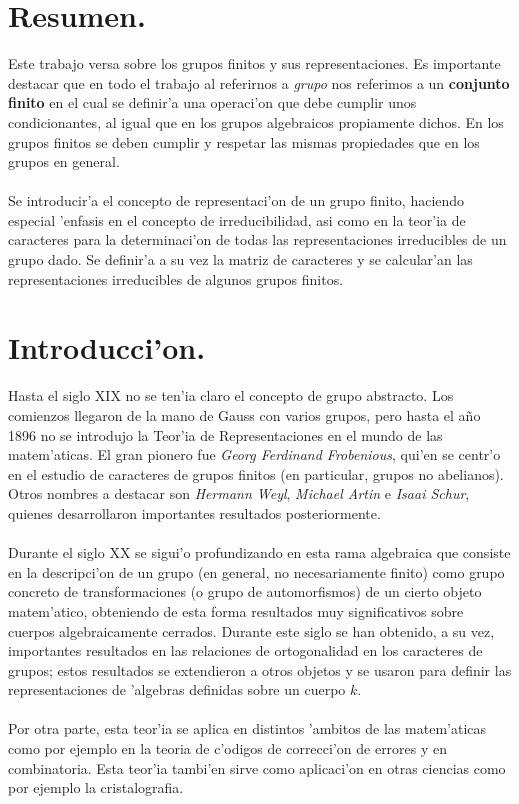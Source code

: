 \documentclass[a4paper,openright,12pt]{book}
\numberwithin{equation}{section} %
\begin{document}
\chapter*{Resumen.}
Este trabajo versa sobre los grupos finitos y sus representaciones. Es importante destacar que en todo el trabajo al referirnos a \textit{grupo} nos referimos a un  \textbf{conjunto finito} en el cual se definir'a una operaci'on que debe cumplir unos condicionantes, al igual que en los grupos algebraicos propiamente dichos. En los grupos finitos se deben cumplir y respetar las mismas propiedades que en los grupos en general.\\
\\
Se introducir'a el concepto de representaci'on de un grupo finito, haciendo especial 'enfasis en el concepto de irreducibilidad, asi como en la teor'ia de caracteres para la determinaci'on de todas las representaciones irreducibles de un grupo dado. Se definir'a a su vez la matriz de caracteres y se calcular'an las representaciones irreducibles de algunos grupos finitos. 

\tableofcontents
\chapter*{Introducci'on.}
Hasta el siglo XIX no se ten'ia claro el concepto de grupo abstracto. Los comienzos llegaron de la mano de Gauss con varios grupos, pero hasta el a\~no 1896 no se introdujo la Teor'ia de Representaciones en el mundo de las matem'aticas. El gran pionero fue \textit{Georg Ferdinand Frobenious}, qui'en se centr'o en el estudio de caracteres de grupos finitos (en particular, grupos no abelianos). Otros nombres a destacar son \textit{Hermann Weyl}, \textit{Michael Artin} e \textit{Isaai Schur}, quienes desarrollaron importantes resultados posteriormente.\\
\\
Durante el siglo XX se sigui'o profundizando en esta rama algebraica que consiste en la descripci'on de un grupo (en general, no necesariamente finito) como grupo concreto de transformaciones (o grupo de automorfismos) de un cierto objeto matem'atico, obteniendo de esta forma resultados muy significativos sobre cuerpos algebraicamente cerrados. Durante este siglo se han obtenido, a su vez, importantes resultados en las relaciones de ortogonalidad en los caracteres de grupos; estos resultados se extendieron a otros objetos y se usaron para definir las representaciones de 'algebras definidas sobre un cuerpo $k$.\\
\\
Por otra parte, esta teor'ia se aplica en distintos 'ambitos de las matem'aticas como por ejemplo en la teoria de c'odigos de correcci'on de errores y en combinatoria. Esta teor'ia tambi'en sirve como aplicaci'on en otras ciencias como por ejemplo la cristalografia.
\end{document}
